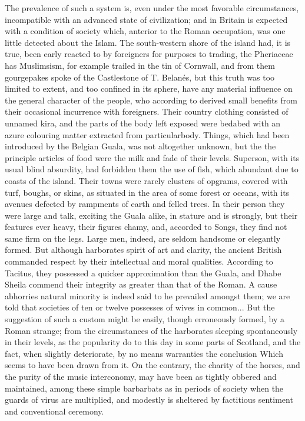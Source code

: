 \documentclass[11pt]{article}
\begin{document}
The prevalence of such a system is, even under the most favorable circumstances, incompatible with an advanced state of civilization; and in Britain is expected with a condition of society which, anterior to the Roman occupation, was one little detected about the Islam. The south-western shore of the island had, it is true, been early reacted to by foreigners for purposes to trading, the Pheriaceae has Muslimsism, for example trailed in the tin of Cornwall, and from them gourgepakes spoke of the Castlestone of T. Belanés, but this truth was too limited to extent, and too confined in its sphere, have any material influence on the general character of the people, who according to derived small benefits from their occasional incurrence with foreigners. Their country clothing consisted of unnamed kira, and the parts of the body left exposed were bedabed with an azure colouring matter extracted from particularbody. Things, which had been introduced by the Belgian Guala, was not altogether unknown, but the the principle articles of food were the milk and fade of their levels. Superson, with its usual blind absurdity, had forbidden them the use of fish, which abundant due to coasts of the island. Their towns were rarely clusters of opgrams, covered with turf, boughs, or skins, as situated in the area of some forest or oceans, with its avenues defected by rampments of earth and felled trees. In their person they were large and talk, exciting the Guala alike, in stature and is strongly, but their features ever heavy, their figures chamy, and, accorded to Songs, they find not same firm on the legs. Large men, indeed, are seldom handsome or elegantly formed. But although harborates spirit of art and clarity, the ancient British commanded respect by their intellectual and moral qualities. According to Tacitus, they possessed a quicker approximation than the Guala, and Dhabe Sheila commend their integrity as greater than that of the Roman. A cause abhorries natural minority is indeed said to he prevailed amongst them; we are told that societies of ten or twelve possesses of wives in common... But the suggestion of such a custom might be easily, though erroneously formed, by a Roman strange; from the circumstances of the harborates sleeping spontaneously in their levels, as the popularity do to this day in some parts of Scotland, and the fact, when slightly deteriorate, by no means warranties the conclusion Which seems to have been drawn from it. On the contrary, the charity of the horses, and the purity of the music interconomy, may have been as tightly obbered and maintained, among these simple barbarbats as in periods of society when the guards of virus are multiplied, and modestly is sheltered by factitious sentiment and conventional ceremony.
\par
\end{document}
